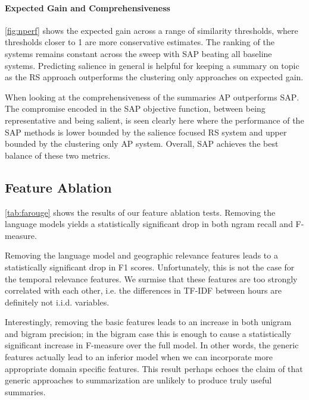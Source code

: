 

\paragraph{Expected Gain and Comprehensiveness}
\autoref{fig:nperf} shows the expected gain across a range of similarity
thresholds, where thresholds closer to 1 are more conservative estimates.  The
ranking of the systems remains constant across the sweep with \textsc{SAP}
beating all baseline systems. Predicting salience in general is helpful for
keeping a summary on topic as the \textsc{RS} approach outperforms the
clustering only approaches on expected gain.

When looking at the comprehensiveness of the summaries \textsc{AP} outperforms
\textsc{SAP}. The compromise encoded in the \textsc{SAP} objective function,
between being representative and being salient, is seen clearly here where the
performance of the \textsc{SAP} methods is lower bounded by the salience
focused \textsc{RS} system and upper bounded by the clustering only \textsc{AP}
system. Overall, \textsc{SAP} achieves the best balance of these two metrics.

\subsection{Feature Ablation}


\autoref{tab:farouge} shows the results of our feature ablation tests.
Removing the language models yields a statistically significant drop in both
ngram recall and F-measure. 

Removing the language model and geographic relevance features leads to a
statistically significant drop in  F1 scores. Unfortunately, this is
not the case for the temporal relevance features. We surmise that these
features are too strongly correlated with each other, i.e. the differences in
TF-IDF between hours are definitely not i.i.d.  variables. 

Interestingly, removing the basic features leads to an increase in both unigram
and bigram precision; in the bigram case this is enough to cause a
statistically significant increase in F-measure over the full model. In other
words, the generic features actually lead to an inferior model when we can
incorporate more appropriate domain specific features.  This result perhaps
echoes the claim of \cite{jones1999} that generic approaches to summarization
are unlikely to produce truly useful summaries.
